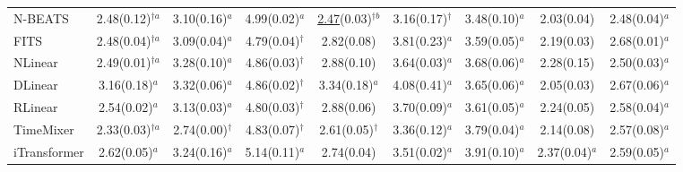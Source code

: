 \begin{table}[!t]
\begin{adjustbox}{max width=\linewidth}
\begin{tabular}{lcccccccc}
N-BEATS & 2.48{\scriptsize\color{gray}(0.12)}$^{\dagger{}a}$ & 3.10{\scriptsize\color{gray}(0.16)}$^{a}$ & 4.99{\scriptsize\color{gray}(0.02)}$^{a}$ & \underline{2.47}{\scriptsize\color{gray}(0.03)}$^{\dagger{}b}$ & 3.16{\scriptsize\color{gray}(0.17)}$^{\dagger{}}$ & 3.48{\scriptsize\color{gray}(0.10)}$^{a}$ & 2.03{\scriptsize\color{gray}(0.04)} & 2.48{\scriptsize\color{gray}(0.04)}$^{a}$ \\
FITS & 2.48{\scriptsize\color{gray}(0.04)}$^{\dagger{}a}$ & 3.09{\scriptsize\color{gray}(0.04)}$^{a}$ & 4.79{\scriptsize\color{gray}(0.04)}$^{\dagger{}}$ & 2.82{\scriptsize\color{gray}(0.08)} & 3.81{\scriptsize\color{gray}(0.23)}$^{a}$ & 3.59{\scriptsize\color{gray}(0.05)}$^{a}$ & 2.19{\scriptsize\color{gray}(0.03)} & 2.68{\scriptsize\color{gray}(0.01)}$^{a}$ \\
NLinear & 2.49{\scriptsize\color{gray}(0.01)}$^{\dagger{}a}$ & 3.28{\scriptsize\color{gray}(0.10)}$^{a}$ & 4.86{\scriptsize\color{gray}(0.03)}$^{\dagger{}}$ & 2.88{\scriptsize\color{gray}(0.10)} & 3.64{\scriptsize\color{gray}(0.03)}$^{a}$ & 3.68{\scriptsize\color{gray}(0.06)}$^{a}$ & 2.28{\scriptsize\color{gray}(0.15)} & 2.50{\scriptsize\color{gray}(0.03)}$^{a}$ \\
DLinear & 3.16{\scriptsize\color{gray}(0.18)}$^{a}$ & 3.32{\scriptsize\color{gray}(0.06)}$^{a}$ & 4.86{\scriptsize\color{gray}(0.02)}$^{\dagger{}}$ & 3.34{\scriptsize\color{gray}(0.18)}$^{a}$ & 4.08{\scriptsize\color{gray}(0.41)}$^{a}$ & 3.65{\scriptsize\color{gray}(0.06)}$^{a}$ & 2.05{\scriptsize\color{gray}(0.03)} & 2.67{\scriptsize\color{gray}(0.06)}$^{a}$ \\
RLinear & 2.54{\scriptsize\color{gray}(0.02)}$^{a}$ & 3.13{\scriptsize\color{gray}(0.03)}$^{a}$ & 4.80{\scriptsize\color{gray}(0.03)}$^{\dagger{}}$ & 2.88{\scriptsize\color{gray}(0.06)} & 3.70{\scriptsize\color{gray}(0.09)}$^{a}$ & 3.61{\scriptsize\color{gray}(0.05)}$^{a}$ & 2.24{\scriptsize\color{gray}(0.05)} & 2.58{\scriptsize\color{gray}(0.04)}$^{a}$ \\
TimeMixer & 2.33{\scriptsize\color{gray}(0.03)}$^{\dagger{}a}$ & 2.74{\scriptsize\color{gray}(0.00)}$^{\dagger{}}$ & 4.83{\scriptsize\color{gray}(0.07)}$^{\dagger{}}$ & 2.61{\scriptsize\color{gray}(0.05)}$^{\dagger{}}$ & 3.36{\scriptsize\color{gray}(0.12)}$^{a}$ & 3.79{\scriptsize\color{gray}(0.04)}$^{a}$ & 2.14{\scriptsize\color{gray}(0.08)} & 2.57{\scriptsize\color{gray}(0.08)}$^{a}$ \\
iTransformer & 2.62{\scriptsize\color{gray}(0.05)}$^{a}$ & 3.24{\scriptsize\color{gray}(0.16)}$^{a}$ & 5.14{\scriptsize\color{gray}(0.11)}$^{a}$ & 2.74{\scriptsize\color{gray}(0.04)} & 3.51{\scriptsize\color{gray}(0.02)}$^{a}$ & 3.91{\scriptsize\color{gray}(0.10)}$^{a}$ & 2.37{\scriptsize\color{gray}(0.04)}$^{a}$ & 2.59{\scriptsize\color{gray}(0.05)}$^{a}$ \\

\end{tabular}
\end{adjustbox}
\end{table}
